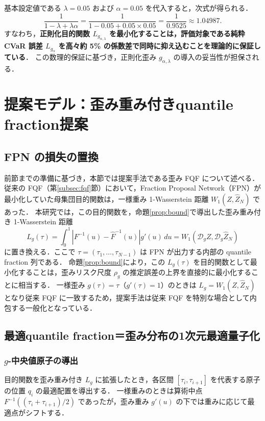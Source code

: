 \documentclass[a4paper,10pt]{jsarticle}
\theoremstyle{definition}
\newcommand{\Wone}{W_1}
\renewcommand{\Finv}{F^{-1}}
\newcommand{\Fhinv}{\hat{F}^{-1}}
\newcommand{\dist}{\mathcal{D}_g}
\begin{document}
基本設定値である $\lambda=0.05$ および $\alpha=0.05$ を代入すると，次式が得られる．
\begin{equation}
  \frac{1}{1-\lambda+\lambda\alpha} = \frac{1}{1 - 0.05 + 0.05\times0.05} = \frac{1}{0.9525} \approx 1.04987.
\end{equation}
すなわち，\textbf{正則化目的関数 $L_{g_{\alpha,\lambda}}$ を最小化することは，評価対象である純粋 CVaR 誤差 $L_{g_\alpha}$ を高々約 5\% の係数差で同時に抑え込むことを理論的に保証している}．
この数理的保証に基づき，正則化歪み $g_{\alpha,\lambda}$ の導入の妥当性が担保される．

\section{提案モデル：歪み重み付きquantile fraction提案}
\label{sec:proposed}

\subsection{FPN の損失の置換}
前節までの準備に基づき，本節では提案手法である歪み FQF について述べる．
従来の FQF（第\ref{subsec:fqf}節）において，Fraction Proposal Network（FPN）が最小化していた母集団目的関数は，一様重み 1-Wasserstein 距離 $\Wone(Z, \hat Z_N)$ であった．
本研究では，この目的関数を，命題\ref{prop:bound}で導出した歪み重み付き 1-Wasserstein 距離
\begin{equation}
  L_g(\tau) = \int_0^1 \left|\Finv(u) - \Fhinv(u)\right| g'(u)\,du = \Wone(\dist Z, \dist\hat Z_N)
  \label{eq:Lg}
\end{equation}
に置き換える．ここで $\tau = (\tau_1, \dots, \tau_{N-1})$ は FPN が出力する内部の quantile fraction 列である．
命題\ref{prop:bound}により，この $L_g(\tau)$ を目的関数として最小化することは，歪みリスク尺度 $\rho_g$ の推定誤差の上界を直接的に最小化することに相当する．
一様歪み $g(\tau)=\tau$（$g'(\tau)=1$）のときは $L_g = \Wone(Z, \hat Z_N)$ となり従来 FQF に一致するため，提案手法は従来 FQF を特別な場合として内包する一般化となっている．

\subsection{最適quantile fraction＝歪み分布の1次元最適量子化}

\subsubsection{$g$-中央値原子の導出}
目的関数を歪み重み付き $L_g$ に拡張したとき，各区間 $[\tau_i, \tau_{i+1}]$ を代表する原子の位置 $q_i$ の最適配置を導出する．
一様重みのときは算術中点 $\Finv((\tau_i+\tau_{i+1})/2)$ であったが，歪み重み $g'(u)$ の下では重みに応じて最適点がシフトする．
\end{document}
